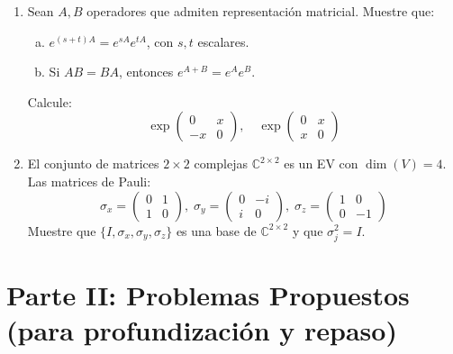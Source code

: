 \documentclass[12pt,a4paper]{article}
\begin{document}
\begin{enumerate}[1.]
\item Sean $A,B$ operadores que admiten representación matricial. Muestre que:
\begin{enumerate}[a)]
\item $e^{(s+t)A} = e^{sA}e^{tA}$, con $s,t$ escalares.
\item Si $AB=BA$, entonces $e^{A+B}=e^Ae^B$.
\end{enumerate}
Calcule:
\[
\exp\begin{pmatrix}0 & x \\ -x & 0\end{pmatrix},\quad
\exp\begin{pmatrix}0 & x \\ x & 0\end{pmatrix}
\]

\item El conjunto de matrices $2\times2$ complejas $\mathbb{C}^{2\times2}$ es un EV con $\dim(V)=4$. Las matrices de Pauli:
\[
\sigma_x=\begin{pmatrix}0 & 1 \\ 1 & 0\end{pmatrix},\;
\sigma_y=\begin{pmatrix}0 & -i \\ i & 0\end{pmatrix},\;
\sigma_z=\begin{pmatrix}1 & 0 \\ 0 & -1\end{pmatrix}
\]
Muestre que $\{I,\sigma_x,\sigma_y,\sigma_z\}$ es una base de $\mathbb{C}^{2\times2}$ y que $\sigma_j^2 = I$.
\end{enumerate}

\section*{Parte II: Problemas Propuestos (para profundización y repaso)}
\end{document}
